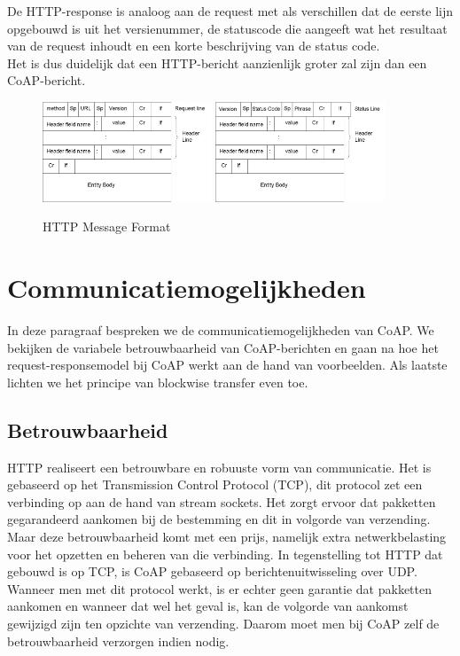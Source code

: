 De HTTP-response is analoog aan de request met als verschillen dat de eerste lijn opgebouwd is uit het versienummer, de statuscode die aangeeft wat het resultaat van de request inhoudt en een korte beschrijving van de status code.\\
Het is dus duidelijk dat een HTTP-bericht aanzienlijk groter zal zijn dan een CoAP-bericht.

\begin{figure}[h]
\vspace{10pt}
\centering
{}
{\includegraphics[width=0.45\textwidth]{fig/HTTPRequestMessageFormat}}
{\includegraphics[width=0.45\textwidth]{fig/HTTPResponseMessageFormat}}
\caption{HTTP Message Format}\label{fig:HTTPMessageFormat}
\end{figure}

\newpage

\section{Communicatiemogelijkheden} \label{communicatieMogelijkheden}

In deze paragraaf bespreken we de communicatiemogelijkheden van CoAP. We bekijken de variabele betrouwbaarheid van CoAP-berichten en gaan na hoe het request-responsemodel bij CoAP werkt aan de hand van voorbeelden. Als laatste lichten we het principe van blockwise transfer even toe.

\subsection{Betrouwbaarheid} \label{betrouwbaarheid}

HTTP realiseert een betrouwbare en robuuste vorm van communicatie. Het is gebaseerd op het Transmission Control Protocol (TCP), dit protocol zet een verbinding op aan de hand van stream sockets. Het zorgt ervoor dat pakketten gegarandeerd aankomen bij de bestemming en dit in volgorde van verzending. Maar deze betrouwbaarheid komt met een prijs, namelijk extra netwerkbelasting voor het opzetten en beheren van die verbinding. In tegenstelling tot HTTP dat gebouwd is op TCP, is CoAP gebaseerd op berichtenuitwisseling over UDP. Wanneer men met dit protocol werkt, is er echter geen garantie dat pakketten aankomen en wanneer dat wel het geval is, kan de volgorde van aankomst gewijzigd zijn ten opzichte van verzending. Daarom moet men bij CoAP zelf de betrouwbaarheid verzorgen indien nodig.

